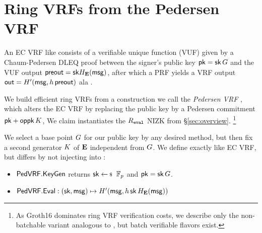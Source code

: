 \section{Ring VRFs from the Pedersen VRF}
\label{sec:pederson_vrf}

An EC VRF like \cite{nsec5,VXEd25519,draft-irtf-cfrg-vrf-10} consists of
a verifiable unique function (VUF) given by a Chaum-Pedersen DLEQ proof
between the signer's public key $\mathsf{pk} = \mathsf{sk} \, G$ and
 the VUF output ${\mathsf{preout}} = \mathsf{sk} H_{{\mathbf{E}}}(\mathsf{msg})$,
after which a PRF  yields a VRF output
 ${\mathsf{out}} = H'(\mathsf{msg}, h \, {\mathsf{preout}})$ ala \cite[Proposition 1]{vrf_micali}.

We build efficient ring VRFs from a construction we call the
{\em Pedersen VRF} \PedVRF, which alters the EC VRF by replacing the
public key by a Pedersen commitment $\mathsf{pk} + \mathsf{oppk} \, K$,
We claim \PedVRF instantiates the $R_{\mathtt{eval}}$ NIZK from \S\ref{sec:overview}.
\footnote{As Groth16 dominates ring VRF verification costs,
we describe only the non-batchable variant analogous to
\cite{nsec5,VXEd25519,draft-irtf-cfrg-vrf-10}, but
 batch verifiable flavors exist.}


We select a base point $G$ for our public key by any desired method,
but then fix a second generator $K$ of ${\mathbf{E}}$ independent from $G$.
%
We define \KeyGen exactly like EC VRF, but
 \Eval differs by not injecting \pk into \msg:
\begin{itemize}
\item ${\mathsf{PedVRF}}.{\mathsf{KeyGen}}$ \quad returns $\sk \leftsample \F_p$ and $\mathsf{pk} = \mathsf{sk} \, G$.
\item ${\mathsf{PedVRF}}.{\mathsf{Eval}} : (\mathsf{sk},\mathsf{msg}) \mapsto H'(\mathsf{msg}, h \, \mathsf{sk} \, H_{{\mathbf{E}}}(\mathsf{msg}))$
\end{itemize}

